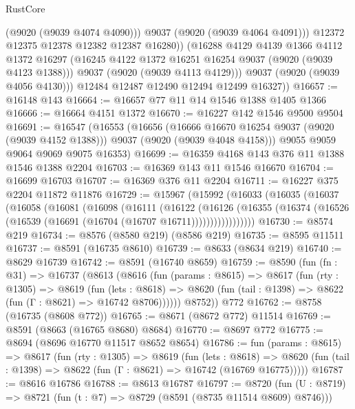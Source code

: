 \begin{lexlean}{RustCore}
\begin{coremodule}
                  (@9020 (@9039 @4074 @4090)))
                @9037
                (@9020 (@9039 @4064 @4091)))
              @12372
              @12375
              @12378
              @12382
              @12387
              @16280))
          (@16288
            @4129
            @4139
            @1366
            @4112
            @1372
            @16297
            (@16245 @4122 @1372 @16251 @16254 @9037 (@9020 (@9039 @4123 @1388)))
            @9037
            (@9020 (@9039 @4113 @4129)))
          @9037
          (@9020 (@9039 @4056 @4130)))
        @12484
        @12487
        @12490
        @12494
        @12499
        @16327))
@16657 := @16148 @143
@16664 := @16657 @77 @11 @14 @1546 @1388 @1405 @1366
@16666 := @16664 @4151 @1372
@16670 := @16227 @142 @1546 @9500 @9504
@16691 := @16547
    (@16553
      (@16656
        (@16666 @16670 @16254 @9037 (@9020 (@9039 @4152 @1388)))
        @9037
        (@9020 (@9039 @4048 @4158)))
      @9055
      @9059
      @9064
      @9069
      @9075
      @16353)
@16699 := @16359 @4168 @143 @376 @11 @1388 @1546 @1388 @2204
@16703 := @16369 @143 @11 @1546 @16670
@16704 := @16699 @16703
@16707 := @16369 @376 @11 @2204
@16711 := @16227 @375 @2204 @11872 @11876
@16729 := @15967
    (@15992
      (@16033
        (@16035
          (@16037
            (@16058
              (@16081
                (@16098
                  (@16111
                    (@16122
                      (@16126
                        (@16355
                          (@16374 (@16526 (@16539 (@16691 (@16704 (@16707 @16711)))))))))))))))))
@16730 := @8574 @219
@16734 := @8576 (@8580 @219) (@8586 @219)
@16735 := @8595 @11511
@16737 := @8591 (@16735 @8610)
@16739 := @8633 (@8634 @219)
@16740 := @8629 @16739
@16742 := @8591 (@16740 @8659)
@16759 := @8590
    (fun (fn : @31) =>
    @16737
      (@8613
        (@8616
          (fun (params : @8615) =>
          @8617
            (fun (rty : @1305) =>
            @8619
              (fun (lets : @8618) =>
              @8620 (fun (tail : @1398) => @8622 (fun (Γ : @8621) => @16742 @8706))))))
        @8752))
    @772
@16762 := @8758 (@16735 (@8608 @772))
@16765 := @8671 (@8672 @772) @11514
@16769 := @8591 (@8663 (@16765 @8680) @8684)
@16770 := @8697 @772
@16775 := @8694 (@8696 @16770 @11517 @8652 @8654)
@16786 := fun (params : @8615) =>
  @8617
    (fun (rty : @1305) =>
    @8619
      (fun (lets : @8618) =>
      @8620 (fun (tail : @1398) => @8622 (fun (Γ : @8621) => @16742 (@16769 @16775)))))
@16787 := @8616 @16786
@16788 := @8613 @16787
@16797 := @8720
    (fun (U : @8719) => @8721 (fun (t : @7) => @8729 (@8591 (@8735 @11514 @8609) @8746)))

\end{coremodule}
\end{lexlean}
